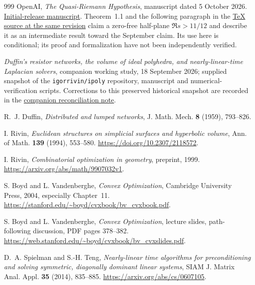 \documentclass[11pt,a4paper]{article}
\numberwithin{equation}{section}
\theoremstyle{definition}
\theoremstyle{remark}
\begin{document}
\begin{thebibliography}{999}
OpenAI,
\emph{The Quasi-Riemann Hypothesis}, manuscript dated 5 October 2026.
\href{https://github.com/openai/math/blob/adc7f1241b42e322a6451854ab7e4b4c146bf78a/preprints/The-Quasi-Riemann-Hypothesis-October-5-2026/paper2.pdf}{Initial-release manuscript}.
Theorem~1.1 and the following paragraph in the
\href{https://raw.githubusercontent.com/openai/math/adc7f1241b42e322a6451854ab7e4b4c146bf78a/preprints/The-Quasi-Riemann-Hypothesis-October-5-2026/build/paper2.tex}{TeX source at the same revision}
claim a zero-free half-plane $\Re s>11/12$ and describe it as an intermediate
result toward the September claim. Its use here is conditional; its proof
and formalization have not been independently verified.


\emph{Duffin's resistor networks, the volume of ideal polyhedra, and
nearly-linear-time Laplacian solvers}, companion working study,
18 September 2026; supplied snapshot of the \texttt{igorrivin/ipoly}
repository, manuscript and numerical-verification scripts.
Corrections to this preserved historical snapshot are recorded in the
\href{companion-reconciliation.md}{companion reconciliation note}.

R.~J. Duffin,
\emph{Distributed and lumped networks},
J. Math. Mech. \textbf{8} (1959), 793--826.

I. Rivin,
\emph{Euclidean structures on simplicial surfaces and hyperbolic volume},
Ann. of Math. \textbf{139} (1994), 553--580.
\url{https://doi.org/10.2307/2118572}.

I. Rivin,
\emph{Combinatorial optimization in geometry}, preprint, 1999.
\url{https://arxiv.org/abs/math/9907032v1}.

S. Boyd and L. Vandenberghe,
\emph{Convex Optimization}, Cambridge University Press, 2004,
especially Chapter~11.
\url{https://stanford.edu/~boyd/cvxbook/bv_cvxbook.pdf}.

S. Boyd and L. Vandenberghe,
\emph{Convex Optimization}, lecture slides, path-following discussion,
PDF pages 378--382.
\url{https://web.stanford.edu/~boyd/cvxbook/bv_cvxslides.pdf}.

D.~A. Spielman and S.-H. Teng,
\emph{Nearly-linear time algorithms for preconditioning and solving
symmetric, diagonally dominant linear systems},
SIAM J. Matrix Anal. Appl. \textbf{35} (2014), 835--885.
\url{https://arxiv.org/abs/cs/0607105}.


\end{thebibliography}
\end{document}
